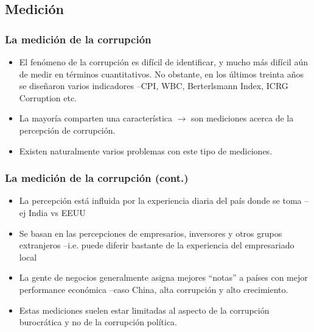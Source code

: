 \documentclass[handout,final,xcolor=dvipsnames]{beamer}
\begin{document}
\subsection{Medición}



\begin{frame}\frametitle{La medición de la corrupción}
\begin{itemize}\itemsep 10pt
\item El fenómeno de la corrupción es difícil de identificar, y mucho
  más difícil aún de medir en términos cuantitativos. No obstante, en
  los últimos treinta años se diseñaron varios indicadores --CPI, WBC,
  Berterlsmann Index, ICRG Corruption etc.
\item La mayoría comparten una característica $\longrightarrow$ son
  mediciones acerca de la percepción de corrupción. 
\item Existen naturalmente varios problemas con este tipo de mediciones.
\end{itemize}
\end{frame}


\begin{frame}\frametitle{La medición de la corrupción (cont.)}
\begin{itemize}\itemsep 10pt
\item La percepción está influida por la experiencia diaria del país
  donde se toma --ej India vs EEUU
\item Se basan en las percepciones de empresarios, inversores y otros
  grupos extranjeros --i.e. puede diferir bastante de la experiencia
  del empresariado local
\item La gente de negocios generalmente asigna mejores ``notas'' a
  países con mejor performance económica --caso China, alta corrupción
  y alto crecimiento. 
\item Estas mediciones suelen estar limitadas al aspecto de la
  corrupción burocrática y no de la corrupción política. 
\end{itemize}
\end{frame}
\end{document}
